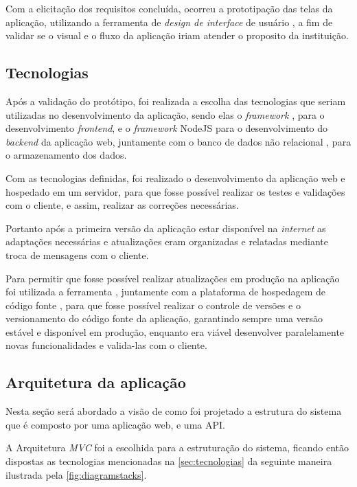 Com a elicitação dos requisitos concluída, ocorreu a prototipação das telas da aplicação, utilizando a ferramenta de \textit{design de interface } de usuário , a fim de validar se o visual e o fluxo da aplicação iriam atender o proposito da instituição.


\subsection{Tecnologias}\label{sec:tecnologias}
Após a validação do protótipo, foi realizada a escolha das tecnologias que seriam utilizadas no desenvolvimento da aplicação, sendo elas o \textit{framework} , para o desenvolvimento \textit{frontend}, e o \textit{framework} NodeJS  para o desenvolvimento do \textit{backend} da aplicação web, juntamente com o banco de dados não relacional , para o armazenamento dos dados.

Com as tecnologias definidas, foi realizado o desenvolvimento da aplicação web e hospedado em um servidor, para que fosse possível realizar os testes e validações com o cliente, e assim, realizar as correções necessárias. 

Portanto após a primeira versão da aplicação estar disponível na \textit{internet} as adaptações necessárias e atualizações eram organizadas e relatadas mediante troca de mensagens com o cliente.

Para permitir que fosse possível realizar atualizações em produção na aplicação foi utilizada a ferramenta , juntamente com a plataforma de hospedagem de código fonte , para que fosse possível realizar o controle de versões e o versionamento do código fonte da aplicação, garantindo sempre uma versão estável e disponível em produção, enquanto era viável desenvolver paralelamente novas funcionalidades e valida-las com o cliente.

\subsection{Arquitetura da aplicação}
Nesta seção será abordado a visão de como foi projetado a estrutura do sistema que é composto por uma aplicação web, e uma API.

A Arquitetura \textit{MVC} foi a escolhida para a estruturação do sistema, ficando então dispostas as tecnologias mencionadas na \autoref{sec:tecnologias} da seguinte maneira ilustrada pela  \autoref{fig:diagramstacks}.

